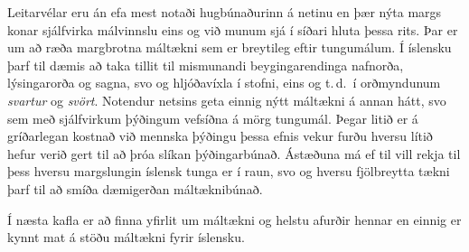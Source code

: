\documentclass{../../metanetpaper}
\begin{document}
\begin{multicols}{2}

Leitarvélar eru án efa mest notaði hugbúnaðurinn á netinu en þær nýta margs konar sjálfvirka málvinnslu eins og við munum sjá í síðari hluta þessa rits. Þar er um að ræða margbrotna máltækni sem er breytileg eftir tungumálum. Í íslensku þarf til dæmis að taka tillit til mismunandi beygingarendinga nafnorða, lýsingarorða og sagna, svo og hljóðavíxla í stofni, eins og t.\,d.~í orðmyndunum \textit{svartur} og \textit{svört}. Notendur netsins geta einnig nýtt máltækni á annan hátt, svo sem með sjálfvirkum þýðingum vefsíðna á mörg tungumál. Þegar litið er á gríðarlegan kostnað við mennska þýðingu þessa efnis vekur furðu hversu lítið hefur verið gert til að þróa slíkan þýðingarbúnað. Ástæðuna má ef til vill rekja til þess hversu margslungin íslensk tunga er í raun, svo og hversu fjölbreytta tækni þarf til að smíða dæmigerðan máltæknibúnað. 

Í næsta kafla er að finna yfirlit um máltækni og helstu afurðir hennar en einnig er kynnt mat á stöðu máltækni fyrir íslensku.

\end{multicols}

\clearpage


\end{document}
